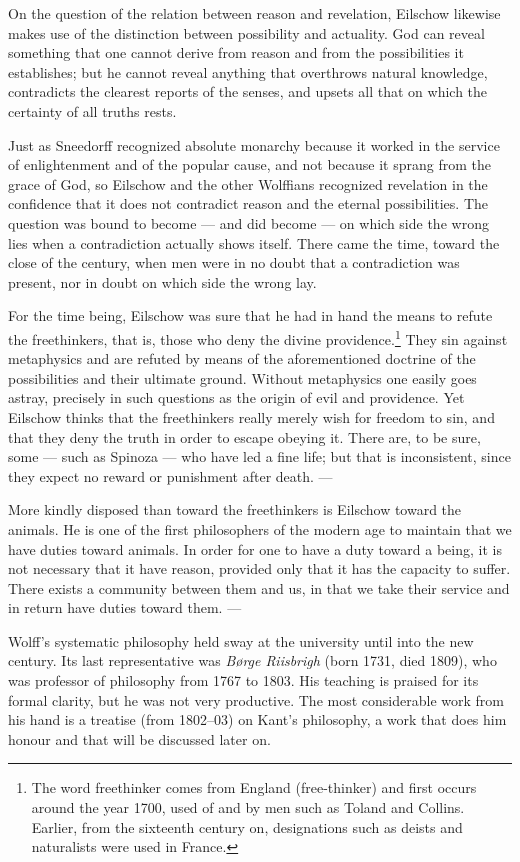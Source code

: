 \documentclass[12pt,a4paper]{book}
\newcommand{\opage}[1]{\marginnote{\footnotesize\textit{[#1]}}}
\begin{document}
\opage{23}On the question of the relation between reason and revelation, Eilschow likewise
makes use of the distinction between possibility and actuality. God can reveal
something that one cannot derive from reason and from the possibilities it
establishes; but he cannot reveal anything that overthrows natural knowledge,
contradicts the clearest reports of the senses, and upsets all that on which the
certainty of all truths rests.

Just as Sneedorff recognized absolute monarchy because it worked in the service of
enlightenment and of the popular cause, and not because it sprang from the grace
of God, so Eilschow and the other Wolffians recognized revelation in the
confidence that it does not contradict reason and the eternal possibilities. The
question was bound to become --- and did become --- on which side the wrong lies
when a contradiction actually shows itself. There came the time, toward the close
of the century, when men were in no doubt that a contradiction was present, nor in
doubt on which side the wrong lay.

For the time being, Eilschow was sure that he had in hand the means to refute the
freethinkers, that is, those who deny the divine providence.\footnote{The word
freethinker comes from England (free-thinker) and first occurs around the year
1700, used of and by men such as Toland and Collins. Earlier, from the sixteenth
century on, designations such as deists and naturalists were used in France.} They
sin against metaphysics and are refuted by means of the aforementioned doctrine of
the possibilities and their ultimate ground. Without metaphysics one easily goes
astray, precisely in such questions as the origin of evil and providence. Yet
Eilschow thinks that the freethinkers really merely wish for freedom to sin, and
that they deny the truth in order to escape obeying it. There are, to be sure,
some --- such as Spinoza --- who have led a fine life; but that is inconsistent,
since they expect no reward or punishment after death. ---

More kindly disposed than toward the freethinkers is Eilschow toward the animals.
He is one of the first philosophers of the modern age \opage{24}to maintain that we have
duties toward animals. In order for one to have a duty toward a being, it is not
necessary that it have reason, provided only that it has the capacity to suffer.
There exists a community between them and us, in that we take their service and in
return have duties toward them. ---

Wolff's systematic philosophy held sway at the university until into the new
century. Its last representative was \emph{Børge Riisbrigh} (born 1731, died 1809), who
was professor of philosophy from 1767 to 1803. His teaching is praised for its
formal clarity, but he was not very productive. The most considerable work from
his hand is a treatise (from 1802--03) on Kant's philosophy, a work that does him
honour and that will be discussed later on.
\end{document}
